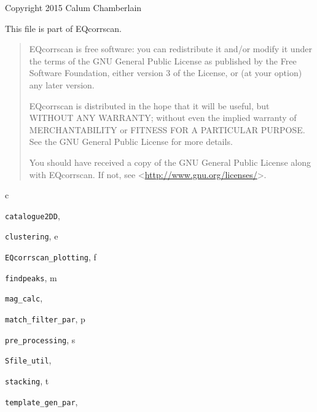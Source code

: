 \documentclass[a4paper,10pt,english]{sphinxmanual}
\begin{document}
Copyright 2015 Calum Chamberlain

This file is part of EQcorrscan.
\begin{quote}

EQcorrscan is free software: you can redistribute it and/or modify
it under the terms of the GNU General Public License as published by
the Free Software Foundation, either version 3 of the License, or
(at your option) any later version.

EQcorrscan is distributed in the hope that it will be useful,
but WITHOUT ANY WARRANTY; without even the implied warranty of
MERCHANTABILITY or FITNESS FOR A PARTICULAR PURPOSE.  See the
GNU General Public License for more details.

You should have received a copy of the GNU General Public License
along with EQcorrscan.  If not, see \textless{}\href{http://www.gnu.org/licenses/}{http://www.gnu.org/licenses/}\textgreater{}.
\end{quote}


\renewcommand{\indexname}{Python Module Index}
\begin{theindex}
\def\bigletter#1{{\Large\sffamily#1}\nopagebreak\vspace{1mm}}
\bigletter{c}
\item {\texttt{catalogue2DD}}, \pageref{utils:module-catalogue2DD}
\item {\texttt{clustering}}, \pageref{utils:module-clustering}
\indexspace
\bigletter{e}
\item {\texttt{EQcorrscan\_plotting}}, \pageref{utils:module-EQcorrscan_plotting}
\indexspace
\bigletter{f}
\item {\texttt{findpeaks}}, \pageref{utils:module-findpeaks}
\indexspace
\bigletter{m}
\item {\texttt{mag\_calc}}, \pageref{utils:module-mag_calc}
\item {\texttt{match\_filter\_par}}, \pageref{par:module-match_filter_par}
\indexspace
\bigletter{p}
\item {\texttt{pre\_processing}}, \pageref{utils:module-pre_processing}
\indexspace
\bigletter{s}
\item {\texttt{Sfile\_util}}, \pageref{utils:module-Sfile_util}
\item {\texttt{stacking}}, \pageref{utils:module-stacking}
\indexspace
\bigletter{t}
\item {\texttt{template\_gen\_par}}, \pageref{par:module-template_gen_par}
\end{theindex}

\renewcommand{\indexname}{Index}
\printindex
\end{document}
